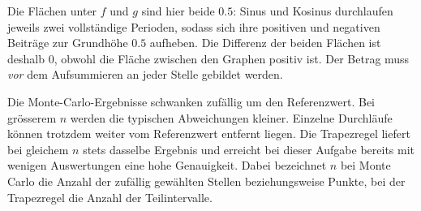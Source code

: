 \begin{myexercise}
\begin{myanswer}
Die Flächen unter $f$ und $g$ sind hier beide $0.5$: Sinus und Kosinus durchlaufen jeweils zwei vollständige Perioden, sodass sich ihre positiven und negativen Beiträge zur Grundhöhe $0.5$ aufheben. Die Differenz der beiden Flächen ist deshalb $0$, obwohl die Fläche zwischen den Graphen positiv ist. Der Betrag muss \emph{vor} dem Aufsummieren an jeder Stelle gebildet werden.

Die Monte-Carlo-Ergebnisse schwanken zufällig um den Referenzwert. Bei grösserem $n$ werden die typischen Abweichungen kleiner. Einzelne Durchläufe können trotzdem weiter vom Referenzwert entfernt liegen. Die Trapezregel liefert bei gleichem $n$ stets dasselbe Ergebnis und erreicht bei dieser Aufgabe bereits mit wenigen Auswertungen eine hohe Genauigkeit. Dabei bezeichnet $n$ bei Monte Carlo die Anzahl der zufällig gewählten Stellen beziehungsweise Punkte, bei der Trapezregel die Anzahl der Teilintervalle.
\end{myanswer}
\end{myexercise}
